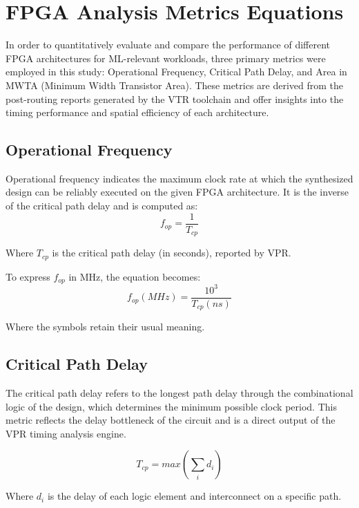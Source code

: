 \section{FPGA Analysis Metrics Equations}
In order to quantitatively evaluate and compare the performance of different FPGA architectures for ML-relevant workloads, three primary metrics were employed in this study: Operational Frequency, Critical Path Delay, and Area in MWTA (Minimum Width Transistor Area). These metrics are derived from the post-routing reports generated by the VTR toolchain and offer insights into the timing performance and spatial efficiency of each architecture.

\subsection{Operational Frequency}
Operational frequency indicates the maximum clock rate at which the synthesized design can be reliably executed on the given FPGA architecture. It is the inverse of the critical path delay and is computed as:
\begin{equation}
	f_{op} = \frac{1}{T_{cp}}
	\label{eq:operational_Frequency_vtr}
\end{equation}

Where $T_{cp}$ is the critical path delay (in seconds), reported by VPR.

To express $f_{op}$ in MHz, the equation becomes:
\begin{equation}
	f_{op}(MHz) = \frac{10^{3}}{T_{cp}(ns)}
	\label{eq:operational_Frequency_vtr_mhz}
\end{equation}

Where the symbols retain their usual meaning.

\subsection{Critical Path Delay}
The critical path delay refers to the longest path delay through the combinational logic of the design, which determines the minimum possible clock period. This metric reflects the delay bottleneck of the circuit and is a direct output of the VPR timing analysis engine.

\begin{equation}
	T_{cp} = max(\sum_{i}d_{i})
\end{equation}

Where $d_{i}$ is the delay of each logic element and interconnect on a specific path. 

